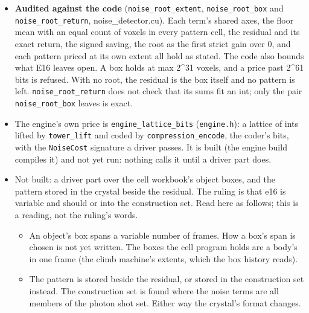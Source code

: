 \begin{itemize}
\begin{itemize}
\item The stack term's pattern is the largest, 16 × 32 × 32 values, against 32 × 32 for the fixed pattern and 16 × 12 for the planes. That it pays last for that reason is a reading; the patterns' own bits were not printed.
\item The noise vector table puts the coherent terms on the kcr set at 1.0\% to 3.0\% of the static background's frame-difference bits (a Gaussian estimate). A real box may hold no root (a reading, still unmeasured).
\end{itemize}
\item \textbf{Audited against the code} (\texttt{noise\_\allowbreak{}root\_\allowbreak{}extent}, \texttt{noise\_\allowbreak{}root\_\allowbreak{}box} and \texttt{noise\_\allowbreak{}root\_\allowbreak{}return}, noise\_\allowbreak{}detector.cu). Each term's shared axes, the floor mean with an equal count of voxels in every pattern cell, the residual and its exact return, the signed saving, the root as the first strict gain over 0, and each pattern priced at its own extent all hold as stated. The code also bounds what E16 leaves open. A box holds at max 2\textasciicircum{}31 voxels, and a price past 2\textasciicircum{}61 bits is refused. With no root, the residual is the box itself and no pattern is left. \texttt{noise\_\allowbreak{}root\_\allowbreak{}return} does not check that its sums fit an int; only the pair \texttt{noise\_\allowbreak{}root\_\allowbreak{}box} leaves is exact.
\item The engine's own price is \texttt{engine\_\allowbreak{}lattice\_\allowbreak{}bits} (\texttt{engine.\allowbreak{}h}): a lattice of ints lifted by \texttt{tower\_\allowbreak{}lift} and coded by \texttt{compression\_\allowbreak{}encode}, the coder's bits, with the \texttt{Noise\allowbreak{}Cost} signature a driver passes. It is built (the engine build compiles it) and not yet run: nothing calls it until a driver part does.
\item Not built: a driver part over the cell workbook's object boxes, and the pattern stored in the crystal beside the residual. The ruling is that e16 is variable and should or into the construction set. Read here as follows; this is a reading, not the ruling's words.

\begin{itemize}
\item An object's box spans a variable number of frames. How a box's span is chosen is not yet written. The boxes the cell program holds are a body's in one frame (the climb machine's extents, which the box history reads).
\item The pattern is stored beside the residual, or stored in the construction set instead. The construction set is found where the noise terms are all members of the photon shot set. Either way the crystal's format changes.
\end{itemize}
\end{itemize}

